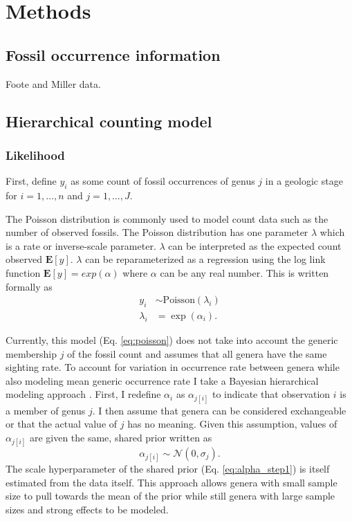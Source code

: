 \documentclass[12pt,letterpaper]{article}
\begin{document}
\section{Methods}

\subsection{Fossil occurrence information}
Foote and Miller data.

\subsection{Hierarchical counting model}

\subsubsection{Likelihood}
First, define \(y_{i}\) as some count of fossil occurrences of genus \(j\) in a geologic stage for \(i = 1, \dots, n\) and \(j = 1, \dots, J\).

The Poisson distribution is commonly used to model count data such as the number of observed fossils. The Poisson distribution has one parameter \(\lambda\) which is a rate or inverse-scale parameter. \(\lambda\) can be interpreted as the expected count observed \(\mathbf{E}[y]\). \(\lambda\) can be reparameterized as a regression using the log link function \(\mathbf{E}[y] = exp(\alpha)\) where \(\alpha\) can be any real number. This is written formally as
\begin{align}
  y_{i} &\sim \mathrm{Poisson}(\lambda_{i}) \nonumber\\
  \lambda_{i} &= \exp(\alpha_{i}).
  \label{eq:poisson} 
\end{align}

Currently, this model (Eq. \ref{eq:poisson}) does not take into account the generic membership \(j\) of the fossil count and assumes that all genera have the same sighting rate. To account for variation in occurrence rate between genera while also modeling mean generic occurrence rate I take a Bayesian hierarchical modeling approach \citep{Gelman2007}. First, I redefine \(\alpha_{i}\) as \(\alpha_{j[i]}\) to indicate that observation \(i\) is a member of genus \(j\). I then assume that genera can be considered exchangeable or that the actual value of \(j\) has no meaning. Given this assumption, values of \(\alpha_{j[i]}\) are given the same, shared prior written as
\begin{equation}
  \alpha_{j[i]} \sim \mathcal{N}(0, \sigma_{j}).
  \label{eq:alpha_step1}
\end{equation}
The scale hyperparameter of the shared prior (Eq. \ref{eq:alpha_step1}) is itself estimated from the data itself. This approach allows genera with small sample size to pull towards the mean of the prior while still genera with large sample sizes and strong effects to be modeled.
\end{document}
